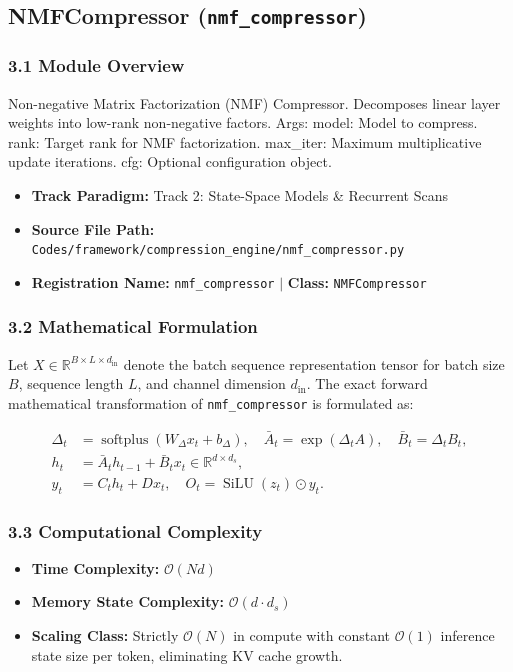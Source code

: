 \subsection{NMFCompressor (\texttt{nmf\_compressor})}
\label{sec:app_module_nmf\_compressor}

\subsubsection*{3.1 Module Overview}
Non-negative Matrix Factorization (NMF) Compressor. Decomposes linear layer weights into low-rank non-negative factors.  Args:     model: Model to compress.     rank: Target rank for NMF factorization.     max\_iter: Maximum multiplicative update iterations.     cfg: Optional configuration object.
\begin{itemize}
    \item \textbf{Track Paradigm:} Track 2: State-Space Models & Recurrent Scans
    \item \textbf{Source File Path:} \texttt{Codes/framework/compression\_engine/nmf\_compressor.py}
    \item \textbf{Registration Name:} \texttt{nmf\_compressor} $\mid$ \textbf{Class:} \texttt{NMFCompressor}
\end{itemize}

\subsubsection*{3.2 Mathematical Formulation}
Let $X \in \mathbb{R}^{B \times L \times d_{\text{in}}}$ denote the batch sequence representation tensor for batch size $B$, sequence length $L$, and channel dimension $d_{\text{in}}$. The exact forward mathematical transformation of \texttt{nmf\_compressor} is formulated as:

\begin{align}
\Delta_t &= \operatorname{softplus}(W_\Delta x_t + b_\Delta), \quad \bar{A}_t = \exp(\Delta_t A), \quad \bar{B}_t = \Delta_t B_t, \\
h_t &= \bar{A}_t h_{t-1} + \bar{B}_t x_t \in \mathbb{R}^{d \times d_s}, \\
y_t &= C_t h_t + D x_t, \quad O_t = \operatorname{SiLU}(z_t) \odot y_t.
\end{align}


\subsubsection*{3.3 Computational Complexity}
\begin{itemize}
    \item \textbf{Time Complexity:} $\mathcal{O}(N d)$
    \item \textbf{Memory State Complexity:} $\mathcal{O}(d \cdot d_s)$
    \item \textbf{Scaling Class:} Strictly $\mathcal{O}(N)$ in compute with constant $\mathcal{O}(1)$ inference state size per token, eliminating KV cache growth.
\end{itemize}


